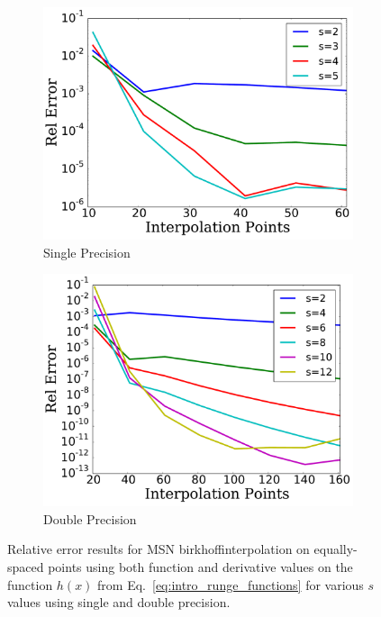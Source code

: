 \begin{figure}
\centering
    \begin{subfigure}{0.45\textwidth}
    \includegraphics[width=\textwidth]{plots/msn_birkhoff_1d_single.pdf}
    \caption{Single Precision}
    \end{subfigure}
    \begin{subfigure}{0.45\textwidth}
    \includegraphics[width=\textwidth]{plots/msn_birkhoff_1d_double.pdf}
    \caption{Double Precision}
    \end{subfigure}
\caption[MSN 1D Birkhoff Intepolation Relative Error]{
Relative error results for MSN birkhoffinterpolation on equally-spaced points
using both function and derivative values on the function $h(x)$
from Eq.~\eqref{eq:intro_runge_functions}
for various $s$ values using single and double precision.}
\label{fig:intro_msn_birkhoff_1d}
\end{figure}

